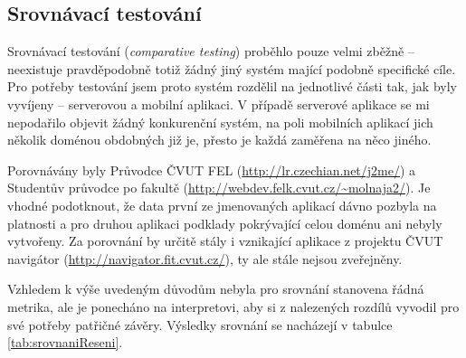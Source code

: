 \subsection{Srovnávací testování}
Srovnávací testování (\textit{comparative testing}) proběhlo pouze velmi zběžně -- neexistuje pravděpodobně totiž žádný jiný systém mající podobně specifické cíle. Pro potřeby testování jsem proto systém rozdělil na jednotlivé části tak, jak byly vyvíjeny -- serverovou a mobilní aplikaci. V případě serverové aplikace se mi nepodařilo objevit žádný konkurenční systém, na poli mobilních aplikací jich několik doménou obdobných již je, přesto je každá zaměřena na něco jiného.

Porovnávány byly Průvodce ČVUT FEL (\url{http://lr.czechian.net/j2me/}) a Studentův průvodce po fakultě (\url{http://webdev.felk.cvut.cz/~molnaja2/}). Je vhodné podotknout, že data první ze jmenovaných aplikací dávno pozbyla na platnosti a pro druhou aplikaci podklady pokrývající celou doménu ani nebyly vytvořeny. Za porovnání by určitě stály i vznikající aplikace z projektu ČVUT navigátor (\url{http://navigator.fit.cvut.cz/}), ty ale stále nejsou zveřejněny.

Vzhledem k výše uvedeným důvodům nebyla pro srovnání stanovena řádná metrika, ale je ponecháno na interpretovi, aby si z nalezených rozdílů vyvodil pro své potřeby patřičné závěry. Výsledky srovnání se nacházejí v tabulce \ref{tab:srovnaniReseni}.

